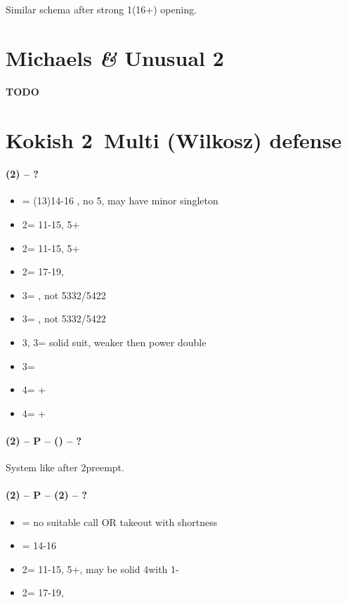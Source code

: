 \documentclass[12pt, a4paper]{report}
\begin{document}
{{        Similar schema after strong 1\clubs (16+) opening.
    }

    \chapter*{\colorbox{Plum!30}{Michaels \textit{\&} Unusual 2\ntx}}
     {
        {\color{red}\textbf{TODO}}
    }

    \chapter*{\colorbox{Plum!30}{Kokish 2\diams\ Multi (Wilkosz) defense}}
     {
        \subsubsection*{(2\diams) -- ?}
        \begin{itemize}
            \item \dbl = (13)14-16 \bal, no 5\major, may have minor singleton \vimp
            \item 2\hearts = 11-15, 5+\hearts
            \item 2\spades = 11-15, 5+\spades
            \item 2\nt = 17-19, \bal
            \item 3\clubs = \clubs, not 5332/5422
            \item 3\diams = \diams, not 5332/5422
            \item 3\hearts, 3\spades = solid suit, weaker then power double
            \item 3\nt = \minor \vimp
            \item 4\clubs = \clubs+\major
            \item 4\diams = \diams+\major
        \end{itemize}

        \subsubsection*{(2\diams) -- P -- () -- ?}
        System like after 2\diams preempt.

        \subsubsection*{(2\diams) -- P -- (2\hearts) -- ?}
        \begin{itemize}
            \item \pass = no suitable call OR takeout with \spades shortness
            \item \dbl = 14-16 \bal \vimp
            \item 2\spades = 11-15, 5+\spades, may be solid 4\spades with 1-\hearts
            \item 2\nt = 17-19, \bal
        \end{itemize}

}}
\end{document}
